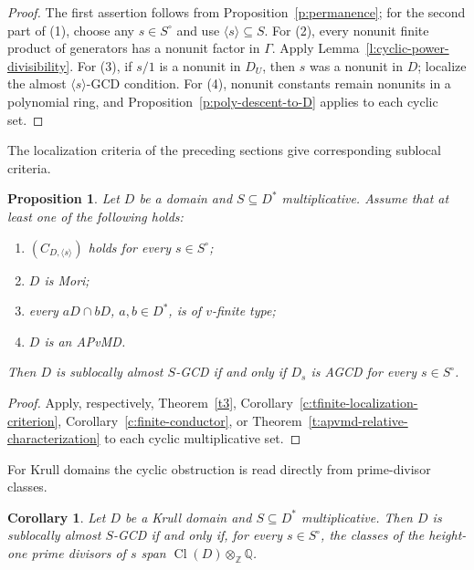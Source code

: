 \documentclass[11pt]{amsart}
\newtheorem{proposition}[theorem]{Proposition}
\newtheorem{corollary}[theorem]{Corollary}
\theoremstyle{definition}
\theoremstyle{remark}
\DeclareMathOperator{\Cl}{Cl}
\newcommand{\ZZ}{\mathbb Z}
\newcommand{\QQ}{\mathbb Q}
\begin{document}
\begin{proof}
The first assertion follows from
Proposition~\ref{p:permanence}; for the second part of (1),
choose any $s\in S^\circ$ and use $\langle s\rangle\subseteq S$.
For (2), every nonunit finite product of generators has a
nonunit factor in $\Gamma$. Apply
Lemma~\ref{l:cyclic-power-divisibility}.
For (3), if $s/1$ is a nonunit in $D_U$, then $s$ was a nonunit
in $D$; localize the almost $\langle s\rangle$-GCD condition.
For (4), nonunit constants remain nonunits in a polynomial
ring, and Proposition~\ref{p:poly-descent-to-D} applies to
each cyclic set.
\end{proof}

The localization criteria of the preceding sections give
corresponding sublocal criteria.

\begin{proposition}\label{p:cyclic-localization-criterion}
\label{c:sublocal-tfinite}
Let $D$ be a domain and $S\subseteq D^\ast$ multiplicative.
Assume that at least one of the following holds:
\begin{enumerate}
\item $(C_{D,\langle s\rangle})$ holds for every $s\in S^\circ$;
\item $D$ is Mori;
\item every $aD\cap bD$, $a,b\in D^\ast$, is of $v$-finite type;
\item $D$ is an APvMD.
\end{enumerate}
Then $D$ is sublocally almost $S$-GCD if and only if $D_s$ is
AGCD for every $s\in S^\circ$.
\end{proposition}

\begin{proof}
Apply, respectively, Theorem~\ref{t3},
Corollary~\ref{c:tfinite-localization-criterion},
Corollary~\ref{c:finite-conductor}, or
Theorem~\ref{t:apvmd-relative-characterization}
to each cyclic multiplicative set.
\end{proof}

For Krull domains the cyclic obstruction is read directly from
prime-divisor classes.

\begin{corollary}\label{c:krull-sublocal-supports}
Let $D$ be a Krull domain and $S\subseteq D^\ast$ multiplicative.
Then $D$ is sublocally almost $S$-GCD if and only if, for every
$s\in S^\circ$, the classes of the height-one prime divisors of
$s$ span $\Cl(D)\otimes_{\ZZ}\QQ$.
\end{corollary}
\end{document}
